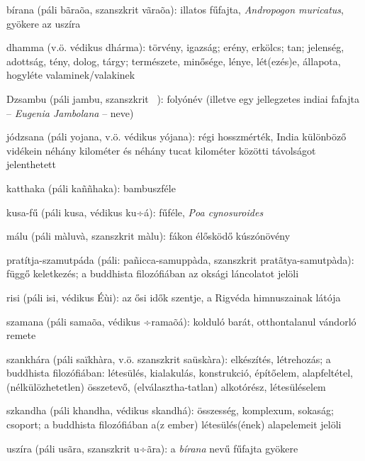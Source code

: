 
bírana (páli bãraõa, szanszkrit vãraõa): illatos fűfajta, \textit{Andropogon muricatus}, gyökere az uszíra

dhamma (v.ö. védikus dhárma): törvény, igazság; erény, erkölcs; tan; jelenség, adottság, tény, dolog, tárgy; természete, minősége, lénye, lét(ezés)e, állapota, hogyléte valaminek/valakinek

Dzsambu (páli jambu, szanszkrit ~): folyónév (illetve egy jellegzetes indiai fafajta – \textit{Eugenia Jambolana} – neve) 

jódzsana (páli yojana, v.ö. védikus yójana): régi hosszmérték, India különböző vidékein néhány kilométer és néhány tucat kilométer közötti távolságot jelenthetett

katthaka (páli kaññhaka): bambuszféle

kusa-fű (páli kusa, védikus ku÷á): fűféle, \textit{Poa cynosuroides}

málu (páli màluvà, szanszkrit màlu): fákon élősködő kúszónövény

pratítja-szamutpáda (páli: pañicca-samuppàda, szanszkrit pratãtya-samutpàda): függő keletkezés; a buddhista filozófiában az oksági láncolatot jelöli

risi (páli isi, védikus\textit{ }Éùi): az ősi idők szentje, a Rigvéda himnuszainak látója

szamana (páli samaõa, védikus\textit{ }÷ramaõá): kolduló barát, otthontalanul vándorló remete


szankhára (páli saïkhàra, v.ö. szanszkrit saüskàra): elkészítés, létrehozás; a buddhista filozófiában: létesülés, kialakulás, konstrukció, építőelem, alapfeltétel, (nélkülözhetetlen) összetevő, (elválasztha-tatlan) alkotórész, létesüléselem

szkandha (páli khandha, védikus skandhá): összesség, komplexum, sokaság; csoport; a buddhista filozófiában a(z ember) létesülés(ének) alapelemeit jelöli

uszíra (páli usãra, szanszkrit u÷ãra): a \textit{bírana} nevű fűfajta gyökere

